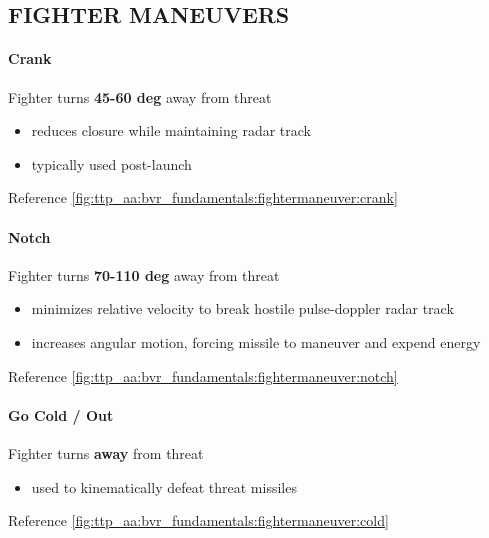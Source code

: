 
\subsection{FIGHTER MANEUVERS}

\paragraph{Crank}
Fighter turns \textbf{45-60 deg} away from threat 

\begin{itemize}
    \item reduces closure while maintaining radar track
    \item typically used post-launch
\end{itemize}

Reference \cref{fig:ttp_aa:bvr_fundamentals:fightermaneuver:crank}
\paragraph{Notch}
Fighter turns \textbf{70-110 deg} away from threat

\begin{itemize}
    \item minimizes relative velocity to break hostile pulse-doppler radar track
    \item increases angular motion, forcing missile to maneuver and expend energy
\end{itemize}

Reference \cref{fig:ttp_aa:bvr_fundamentals:fightermaneuver:notch}
\paragraph{Go Cold / Out}
Fighter turns \textbf{away} from threat

\begin{itemize}
    \item used to kinematically defeat threat missiles
\end{itemize}

Reference \cref{fig:ttp_aa:bvr_fundamentals:fightermaneuver:cold}

\clearpage


